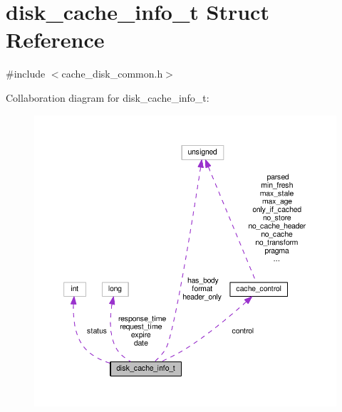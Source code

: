 \hypertarget{structdisk__cache__info__t}{}\section{disk\+\_\+cache\+\_\+info\+\_\+t Struct Reference}
\label{structdisk__cache__info__t}


{\ttfamily \#include $<$cache\+\_\+disk\+\_\+common.\+h$>$}



Collaboration diagram for disk\+\_\+cache\+\_\+info\+\_\+t\+:
\nopagebreak
\begin{figure}[H]
\begin{center}
\leavevmode
\includegraphics[width=350pt]{structdisk__cache__info__t__coll__graph}
\end{center}
\end{figure}
